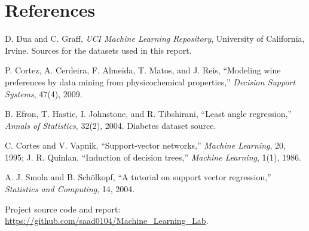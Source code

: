 \section*{References}
\begin{enumerate}[label={[\arabic*]},leftmargin=2.2em,itemsep=2pt,font=\small]
\item D. Dua and C. Graff, \emph{UCI Machine Learning Repository}, University of California, Irvine. Sources for the datasets used in this report.
\item P. Cortez, A. Cerdeira, F. Almeida, T. Matos, and J. Reis, ``Modeling wine preferences by data mining from physicochemical properties,'' \emph{Decision Support Systems}, 47(4), 2009.
\item B. Efron, T. Hastie, I. Johnstone, and R. Tibshirani, ``Least angle regression,'' \emph{Annals of Statistics}, 32(2), 2004. Diabetes dataset source.
\item C. Cortes and V. Vapnik, ``Support-vector networks,'' \emph{Machine Learning}, 20, 1995; J. R. Quinlan, ``Induction of decision trees,'' \emph{Machine Learning}, 1(1), 1986.
\item A. J. Smola and B. Schölkopf, ``A tutorial on support vector regression,'' \emph{Statistics and Computing}, 14, 2004.
\item Project source code and report: \url{https://github.com/saad0104/Machine_Learning_Lab}.
\end{enumerate}
